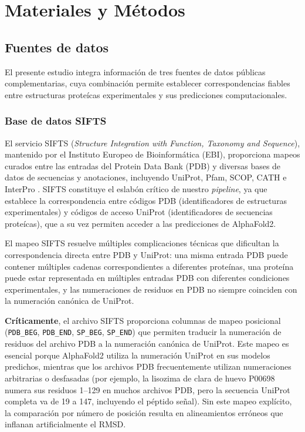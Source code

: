 
\section{Materiales y M\'etodos}
\label{sec:materiales_metodos}

\subsection{Fuentes de datos}
\label{subsec:fuentes_datos}

El presente estudio integra informaci\'on de tres fuentes de datos p\'ublicas complementarias, cuya combinaci\'on permite establecer correspondencias fiables entre estructuras prote\'icas experimentales y sus predicciones computacionales.

\subsubsection{Base de datos SIFTS}
\label{subsubsec:sifts}

El servicio SIFTS (\textit{Structure Integration with Function, Taxonomy and Sequence}), mantenido por el Instituto Europeo de Bioinform\'atica (EBI), proporciona mapeos curados entre las entradas del Protein Data Bank (PDB) y diversas bases de datos de secuencias y anotaciones, incluyendo UniProt, Pfam, SCOP, CATH e InterPro \citep{velankar2013sifts}. SIFTS constituye el eslab\'on cr\'itico de nuestro \textit{pipeline}, ya que establece la correspondencia entre c\'odigos PDB (identificadores de estructuras experimentales) y c\'odigos de acceso UniProt (identificadores de secuencias prote\'icas), que a su vez permiten acceder a las predicciones de AlphaFold2.

El mapeo SIFTS resuelve m\'ultiples complicaciones t\'ecnicas que dificultan la correspondencia directa entre PDB y UniProt: una misma entrada PDB puede contener m\'ultiples cadenas correspondientes a diferentes prote\'inas, una prote\'ina puede estar representada en m\'ultiples entradas PDB con diferentes condiciones experimentales, y las numeraciones de residuos en PDB no siempre coinciden con la numeraci\'on can\'onica de UniProt.

\textbf{Cr\'iticamente}, el archivo SIFTS proporciona columnas de mapeo posicional (\texttt{PDB\_BEG}, \texttt{PDB\_END}, \texttt{SP\_BEG}, \texttt{SP\_END}) que permiten traducir la numeraci\'on de residuos del archivo PDB a la numeraci\'on can\'onica de UniProt. Este mapeo es esencial porque AlphaFold2 utiliza la numeraci\'on UniProt en sus modelos predichos, mientras que los archivos PDB frecuentemente utilizan numeraciones arbitrarias o desfasadas (por ejemplo, la lisozima de clara de huevo P00698 numera sus residuos 1--129 en muchos archivos PDB, pero la secuencia UniProt completa va de 19 a 147, incluyendo el p\'eptido se\~nal). Sin este mapeo expl\'icito, la comparaci\'on por n\'umero de posici\'on resulta en alineamientos err\'oneos que inflanan artificialmente el RMSD.

